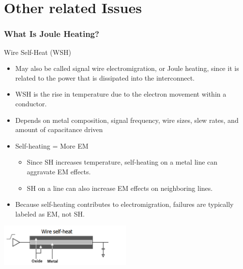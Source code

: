 \documentclass{beamer}
\begin{document}
	\section{Other related Issues}	
	\begin{frame}
		\frametitle{What Is Joule Heating?}
		Wire Self-Heat (WSH)
		\begin{itemize}
			\item May also be called signal wire electromigration, or Joule heating, since it is related to the
			power that is dissipated into the interconnect.
			\item  WSH is the rise in temperature due to the electron movement within a conductor.
			\item  Depends on metal composition, signal frequency, wire sizes, slew rates, and amount of
			capacitance driven
			\item Self-heating = More EM
			\begin{itemize}
				\item Since SH increases temperature, self-heating on a metal line can aggravate EM effects.
				\item SH on a line can also increase EM effects on neighboring lines.
			\end{itemize}	
			\item Because self-heating contributes to electromigration, failures are typically labeled as EM, not SH.
		\end{itemize}
		\begin{center}
			\includegraphics[width=0.5\textwidth]{joules}
		\end{center}
	\end{frame}
\end{document}
